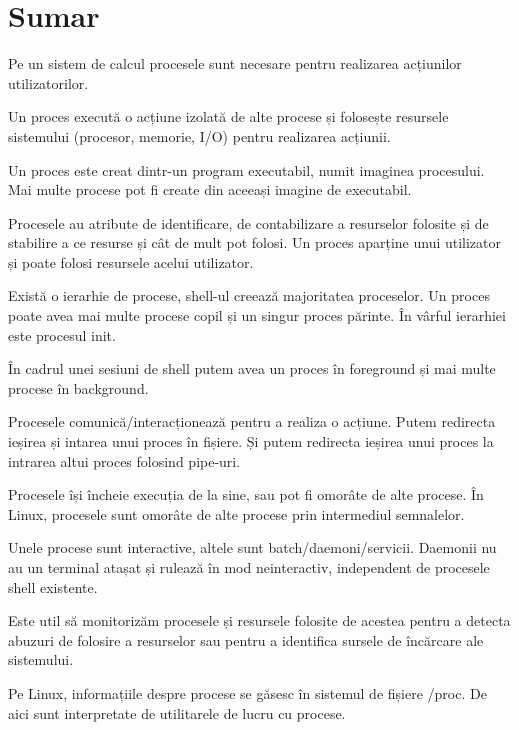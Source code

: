 \section{Sumar}

Pe un sistem de calcul procesele sunt necesare pentru realizarea acțiunilor
utilizatorilor.

Un proces execută o acțiune izolată de alte procese și folosește resursele
sistemului (procesor, memorie, I/O) pentru realizarea acțiunii.

Un proces este creat dintr-un program executabil, numit imaginea procesului. Mai
multe procese pot fi create din aceeași imagine de executabil.

Procesele au atribute de identificare, de contabilizare a resurselor folosite și
de stabilire a ce resurse și cât de mult pot folosi. Un proces aparține unui
utilizator și poate folosi resursele acelui utilizator.

Există o ierarhie de procese, shell-ul creează majoritatea proceselor. Un proces
poate avea mai multe procese copil și un singur proces părinte. În vârful
ierarhiei este procesul init.

În cadrul unei sesiuni de shell putem avea un proces în foreground și mai multe
procese în background.

Procesele comunică/interacționează pentru a realiza o acțiune. Putem redirecta
ieșirea și intarea unui proces în fișiere. Și putem redirecta ieșirea unui
proces la intrarea altui proces folosind pipe-uri.

Procesele își încheie execuția de la sine, sau pot fi omorâte de alte procese.
În Linux, procesele sunt omorâte de alte procese prin intermediul semnalelor.

Unele procese sunt interactive, altele sunt batch/daemoni/servicii. Daemonii nu
au un terminal atașat și rulează în mod neinteractiv, independent de procesele
shell existente.

Este util să monitorizăm procesele și resursele folosite de acestea pentru a
detecta abuzuri de folosire a resurselor sau pentru a identifica sursele de
încărcare ale sistemului.

Pe Linux, informațiile despre procese se găsesc în sistemul de fișiere /proc. De
aici sunt interpretate de utilitarele de lucru cu procese.

